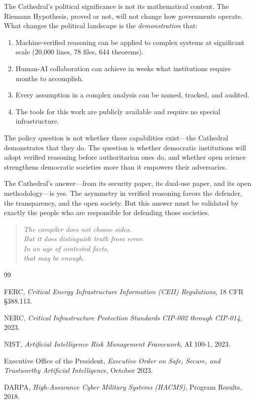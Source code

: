 \documentclass[11pt,a4paper]{article}
\begin{document}
The Cathedral's political significance is not its mathematical
content. The Riemann Hypothesis, proved or not, will not change
how governments operate. What changes the political landscape is
the \emph{demonstration} that:

\begin{enumerate}
  \item Machine-verified reasoning can be applied to complex systems
    at significant scale (20,000 lines, 78 files, 644 theorems).
  \item Human-AI collaboration can achieve in weeks what
    institutions require months to accomplish.
  \item Every assumption in a complex analysis can be named,
    tracked, and audited.
  \item The tools for this work are publicly available and require
    no special infrastructure.
\end{enumerate}

The policy question is not whether these capabilities exist---the
Cathedral demonstrates that they do. The question is whether
democratic institutions will adopt verified reasoning before
authoritarian ones do, and whether open science strengthens
democratic societies more than it empowers their adversaries.

The Cathedral's answer---from its security paper, its dual-use
paper, and its open methodology---is yes. The asymmetry in
verified reasoning favors the defender, the transparency, and
the open society. But this answer must be validated by exactly
the people who are responsible for defending those societies.

\begin{quote}
\emph{The compiler does not choose sides.\\
But it does distinguish truth from error.\\
In an age of contested facts,\\
that may be enough.}
\end{quote}

\begin{thebibliography}{99}

FERC, \emph{Critical Energy Infrastructure Information (CEII)
Regulations}, 18 CFR \S 388.113.

NERC, \emph{Critical Infrastructure Protection Standards
CIP-002 through CIP-014}, 2023.

NIST, \emph{Artificial Intelligence Risk Management Framework},
AI 100-1, 2023.

Executive Office of the President, \emph{Executive Order on Safe,
Secure, and Trustworthy Artificial Intelligence}, October 2023.

DARPA, \emph{High-Assurance Cyber Military Systems (HACMS)},
Program Results, 2018.

\end{thebibliography}
\end{document}
